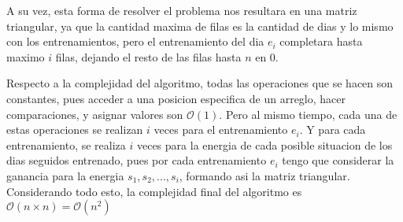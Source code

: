 A su vez, esta forma de resolver el problema nos resultara en una matriz triangular, ya que la cantidad maxima de filas es la cantidad de dias y lo mismo con los entrenamientos, pero el entrenamiento del dia $e_i$ completara hasta maximo $i$ filas, dejando el resto de las filas hasta $n$ en 0.

Respecto a la complejidad del algoritmo, todas las operaciones que se hacen son constantes, pues acceder a una posicion especifica de un arreglo, hacer comparaciones, y asignar valores son $\mathcal{O}(1)$. Pero al mismo tiempo, cada una de estas operaciones se realizan $i$ veces para el entrenamiento $e_i$. Y para cada entrenamiento, se realiza $i$ veces para la energia de cada posible situacion de los dias seguidos entrenado, pues por cada entrenamiento $e_i$ tengo que considerar la ganancia para la energia $s_1, s_2, ..., s_i$, formando asi la matriz triangular. Considerando todo esto, la complejidad final del algoritmo es $\mathcal{O}(n \times n) = \mathcal{O}(n^2)$ 


